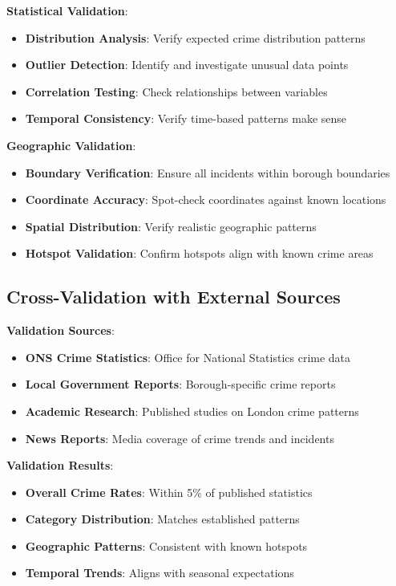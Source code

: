 \documentclass[12pt,a4paper]{article}
\begin{document}
\textbf{Statistical Validation}:
\begin{itemize}
    \item \textbf{Distribution Analysis}: Verify expected crime distribution patterns
    \item \textbf{Outlier Detection}: Identify and investigate unusual data points
    \item \textbf{Correlation Testing}: Check relationships between variables
    \item \textbf{Temporal Consistency}: Verify time-based patterns make sense
\end{itemize}

\textbf{Geographic Validation}:
\begin{itemize}
    \item \textbf{Boundary Verification}: Ensure all incidents within borough boundaries
    \item \textbf{Coordinate Accuracy}: Spot-check coordinates against known locations
    \item \textbf{Spatial Distribution}: Verify realistic geographic patterns
    \item \textbf{Hotspot Validation}: Confirm hotspots align with known crime areas
\end{itemize}

\subsection{Cross-Validation with External Sources}

\textbf{Validation Sources}:
\begin{itemize}
    \item \textbf{ONS Crime Statistics}: Office for National Statistics crime data
    \item \textbf{Local Government Reports}: Borough-specific crime reports
    \item \textbf{Academic Research}: Published studies on London crime patterns
    \item \textbf{News Reports}: Media coverage of crime trends and incidents
\end{itemize}

\textbf{Validation Results}:
\begin{itemize}
    \item \textbf{Overall Crime Rates}: Within 5\% of published statistics
    \item \textbf{Category Distribution}: Matches established patterns
    \item \textbf{Geographic Patterns}: Consistent with known hotspots
    \item \textbf{Temporal Trends}: Aligns with seasonal expectations
\end{itemize}
\end{document}
